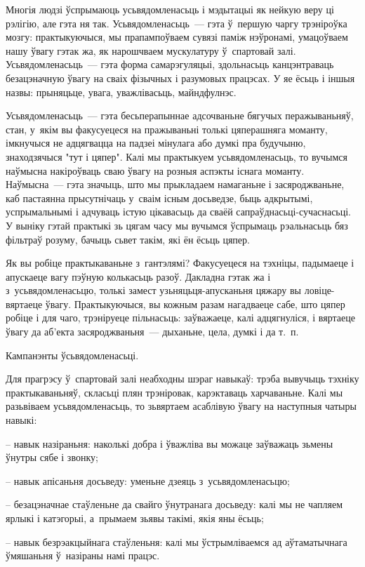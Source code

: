 Многія людзі ўспрымаюць усьвядомленасьць і мэдытацыі як нейкую веру ці рэлігію, але гэта ня так. Усьвядомленасьць~--- гэта ў~першую чаргу трэніроўка мозгу: практыкуючыся, мы прапампоўваем сувязі паміж нэўронамі, умацоўваем нашу ўвагу гэтак жа, як нарошчваем мускулатуру ў~спартовай залі. Усьвядомленасьць~--- гэта форма самарэгуляцыі, здольнасьць канцэнтраваць безацэначную ўвагу на сваіх фізычных і разумовых працэсах. У яе ёсьць і іншыя назвы: прыняцьце, увага, уважлівасьць, майндфулнэс.

Усьвядомленасьць~--- гэта бесьперапыннае адсочваньне бягучых перажываньняў, стан, у~якім вы факусуецеся на пражываньні толькі цяперашняга моманту, імкнучыся не адцягвацца на падзеі мінулага або думкі пра будучыню, знаходзячыся "тут і цяпер". Калі мы практыкуем усьвядомленасьць, то вучымся наўмысна накіроўваць сваю ўвагу на розныя аспэкты існага моманту. Наўмысна~--- гэта значыць, што мы прыкладаем намаганьне і засяроджваньне, каб пастаянна прысутнічаць у~сваім існым досьведзе, быць адкрытымі, успрымальнымі і адчуваць істую цікавасьць да сваёй сапраўднасьці-сучаснасьці. У выніку гэтай практыкі зь цягам часу мы вучымся ўспрымаць рэальнасьць бяз фільтраў розуму, бачыць сьвет такім, які ён ёсьць цяпер.

Як вы робіце практыкаваньне з~гантэлямі? Факусуецеся на тэхніцы, падымаеце і апускаеце вагу пэўную колькасьць разоў. Дакладна гэтак жа і з~усьвядомленасьцю, толькі замест узьняцьця-апусканьня цяжару вы ловіце-вяртаеце ўвагу. Практыкуючыся, вы кожным разам нагадваеце сабе, што цяпер робіце і для чаго, трэніруеце пільнасьць: заўважаеце, калі адцягнуліся, і вяртаеце ўвагу да аб'екта засяроджваньня~--- дыханьне, цела, думкі і да т.~п.

Кампанэнты ўсьвядомленасьці.

Для прагрэсу ў~спартовай залі неабходны шэраг навыкаў: трэба вывучыць тэхніку практыкаваньняў, скласьці плян трэніровак, карэктаваць харчаваньне. Калі мы разьвіваем усьвядомленасьць, то зьвяртаем асаблівую ўвагу на наступныя чатыры навыкі: 

– навык назіраньня: наколькі добра і ўважліва вы можаце заўважаць зьмены ўнутры сябе і звонку;

– навык апісаньня досьведу: уменьне дзеяць з~усьвядомленасьцю;

– безацэначнае стаўленьне да свайго ўнутранага досьведу: калі мы не чапляем ярлыкі і катэгорыі, а~прымаем зьявы такімі, якія яны ёсьць;

– навык безрэакцыйнага стаўленьня: калі мы ўстрымліваемся ад аўтаматычнага ўмяшаньня ў~назіраны намі працэс.


